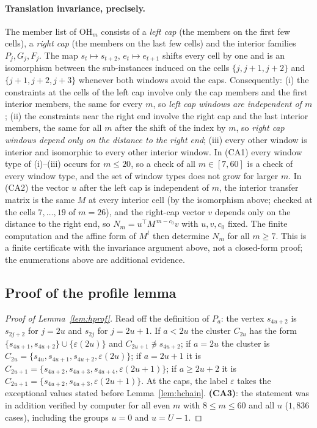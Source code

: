\paragraph{Translation invariance, precisely.} The member list of $\mathrm{OH}_m$ consists of a \emph{left cap} (the members on the first few cells), a \emph{right cap} (the members on the last few cells) and the interior families $P_j,G_j,F_j$. The map $s_t\mapsto s_{t+2}$, $e_t\mapsto e_{t+1}$ shifts every cell by one and is an isomorphism between the sub-instances induced on the cells $\{j,j+1,j+2\}$ and $\{j+1,j+2,j+3\}$ whenever both windows avoid the caps. Consequently: (i) the constraints at the cells of the left cap involve only the cap members and the first interior members, the same for every $m$, so \emph{left cap windows are independent of $m$}; (ii) the constraints near the right end involve the right cap and the last interior members, the same for all $m$ after the shift of the index by $m$, so \emph{right cap windows depend only on the distance to the right end}; (iii) every other window is interior and isomorphic to every other interior window. In (CA1) every window type of (i)--(iii) occurs for $m\le20$, so a check of all $m\in[7,60]$ is a check of every window type, and the set of window types does not grow for larger $m$. In (CA2) the vector $u$ after the left cap is independent of $m$, the interior transfer matrix is the same $M$ at every interior cell (by the isomorphism above; checked at the cells $7,\dots,19$ of $m=26$), and the right-cap vector $v$ depends only on the distance to the right end, so $N_m=u^{\top}M^{\,m-c_0}v$ with $u,v,c_0$ fixed. The finite computation and the affine form of $M^t$ then determine $N_m$ for all $m\ge7$. This is a finite certificate with the invariance argument above, not a closed-form proof; the enumerations above are additional evidence.
\subsection{Proof of the profile lemma}
\begin{proof}[Proof of Lemma~\ref{lem:hprof}]
Read off the definition of $P_a$: the vertex $s_{4u+2}$ is $s_{2j+2}$ for $j=2u$ and $s_{2j}$ for $j=2u+1$. If $a<2u$ the cluster $C_{2u}$ has the form $\{s_{4u+1},s_{4u+2}\}\cup\{\varepsilon(2u)\}$ and $C_{2u+1}\not\ni s_{4u+2}$; if $a=2u$ the cluster is $C_{2u}=\{s_{4u},s_{4u+1},s_{4u+2},\varepsilon(2u)\}$; if $a=2u+1$ it is $C_{2u+1}=\{s_{4u+2},s_{4u+3},s_{4u+4},\varepsilon(2u+1)\}$; if $a\ge2u+2$ it is $C_{2u+1}=\{s_{4u+2},s_{4u+3},\varepsilon(2u+1)\}$. At the caps, the label $\varepsilon$ takes the exceptional values stated before Lemma~\ref{lem:hchain}. \textbf{(CA3)}: the statement was in addition verified by computer for all even $m$ with $8\le m\le60$ and all $u$ ($1{,}836$ cases), including the groups $u=0$ and $u=U-1$.
\end{proof}
